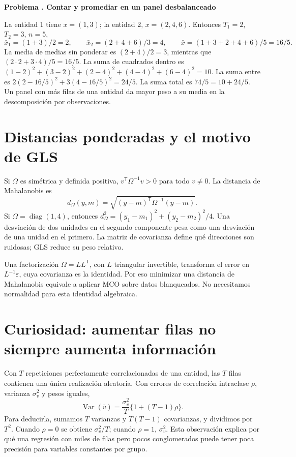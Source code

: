 \documentclass[11pt,a4paper]{article}
\newcommand{\T}{^{\mathsf T}}
\DeclareMathOperator{\Var}{Var}
\DeclareMathOperator{\diag}{diag}
\theoremstyle{definition}
\newcounter{problema}
\newenvironment{resuelto}[1]{\refstepcounter{problema}\par\medskip\Needspace{6\baselineskip}\textbf{Problema \theproblema. #1}\par}{\par\medskip}
\newcommand{\eps}{\varepsilon}
\begin{document}
\begin{resuelto}{Contar y promediar en un panel desbalanceado}
La entidad 1 tiene $x=(1,3)$; la entidad 2, $x=(2,4,6)$.
Entonces $T_1=2$, $T_2=3$, $n=5$,
\[
\bar x_1=(1+3)/2=2,\qquad
\bar x_2=(2+4+6)/3=4,\qquad
\bar x=(1+3+2+4+6)/5=16/5.
\]
La media de medias sin ponderar es $(2+4)/2=3$, mientras que
$(2\cdot2+3\cdot4)/5=16/5$. La suma de cuadrados dentro es
$(1-2)^2+(3-2)^2+(2-4)^2+(4-4)^2+(6-4)^2=10$.
La suma entre es $2(2-16/5)^2+3(4-16/5)^2=24/5$.
La suma total es $74/5=10+24/5$. Un panel con más filas de una entidad da mayor peso a su media en la descomposición por observaciones.
\end{resuelto}

\section{Distancias ponderadas y el motivo de GLS}
Si $\Omega$ es simétrica y definida positiva, $v\T\Omega^{-1}v>0$ para todo $v\ne0$. La distancia de Mahalanobis es
\[
d_\Omega(y,m)=\sqrt{(y-m)\T\Omega^{-1}(y-m)}.
\]
Si $\Omega=\diag(1,4)$, entonces $d_\Omega^2=(y_1-m_1)^2+(y_2-m_2)^2/4$.
Una desviación de dos unidades en el segundo componente pesa como una desviación de una unidad en el primero. La matriz de covarianza define qué direcciones son ruidosas; GLS reduce su peso relativo.

Una factorización $\Omega=LL\T$, con $L$ triangular invertible, transforma el error en $L^{-1}\eps$, cuya covarianza es la identidad. Por eso minimizar una distancia de Mahalanobis equivale a aplicar MCO sobre datos blanqueados. No necesitamos normalidad para esta identidad algebraica.

\section{Curiosidad: aumentar filas no siempre aumenta información}
Con $T$ repeticiones perfectamente correlacionadas de una entidad, las $T$ filas contienen una única realización aleatoria. Con errores de correlación intraclase $\rho$, varianza $\sigma_v^2$ y pesos iguales,
\[
\Var(\bar v)=\frac{\sigma_v^2}{T}\{1+(T-1)\rho\}.
\]
Para deducirla, sumamos $T$ varianzas y $T(T-1)$ covarianzas, y dividimos por $T^2$. Cuando $\rho=0$ se obtiene $\sigma_v^2/T$; cuando $\rho=1$, $\sigma_v^2$. Esta observación explica por qué una regresión con miles de filas pero pocos conglomerados puede tener poca precisión para variables constantes por grupo.
\end{document}
